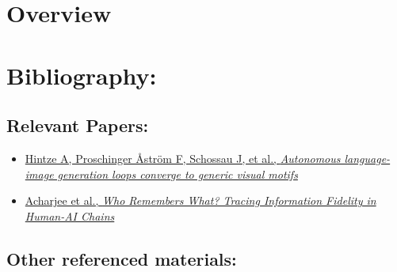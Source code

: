 \documentclass{article}
\begin{document}
\section{Overview}

\section{Bibliography:}
\subsection{Relevant Papers:}
\begin{itemize}

\item\href{https://www.cell.com/patterns/fulltext/S2666-3899(25)00299-5?_returnURL=https%3A%2F%2Flinkinghub.elsevier.com%2Fretrieve%2Fpii%2FS2666389925002995%3Fshowall%3Dtrue}{Hintze A, Proschinger Åström F, Schossau J, et al., \textit{Autonomous language-image generation loops converge to generic visual motifs}}
\item\href{https://aclanthology.org/2025.ijcnlp-long.146/}{Acharjee et al., \textit{Who Remembers What? Tracing Information Fidelity in Human-AI Chains}}

\end{itemize}
\subsection{Other referenced materials:}
\end{document}
